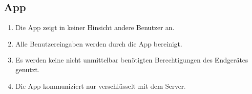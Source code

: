 \subsection{App}

\begin{enumerate}
    \item Die App zeigt in keiner Hinsicht andere Benutzer an.
    \item Alle Benutzereingaben werden durch die App bereinigt.
    \item Es werden keine nicht unmittelbar benötigten Berechtigungen des Endgerätes genutzt.
    \item Die App kommuniziert nur verschlüsselt mit dem Server.
\end{enumerate}